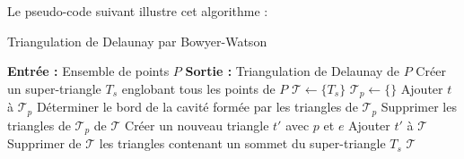 \documentclass[a4paper,12pt]{article}
\theoremstyle{definition}
\begin{document}
Le pseudo-code suivant illustre cet algorithme :

\begin{algorithm}
\caption{Triangulation de Delaunay par Bowyer-Watson}
\begin{algorithmic}[1]
\State \textbf{Entrée :} Ensemble de points \(P\)
\State \textbf{Sortie :} Triangulation de Delaunay de \(P\)
\State Créer un super-triangle \(T_s\) englobant tous les points de \(P\)
\State \(\mathcal{T} \gets \{T_s\}\)
    \State \(\mathcal{T}_p \gets \{\}\)
            \State Ajouter \(t\) à \(\mathcal{T}_p\)
        \EndIf
    \EndFor
    \State Déterminer le bord de la cavité formée par les triangles de \(\mathcal{T}_p\)
    \State Supprimer les triangles de \(\mathcal{T}_p\) de \(\mathcal{T}\)
         \State Créer un nouveau triangle \(t'\) avec \(p\) et \(e\)
         \State Ajouter \(t'\) à \(\mathcal{T}\)
    \EndFor
\EndFor
\State Supprimer de \(\mathcal{T}\) les triangles contenant un sommet du super-triangle \(T_s\)
\State \Return \(\mathcal{T}\)
\end{algorithmic}
\end{algorithm}
\end{document}
